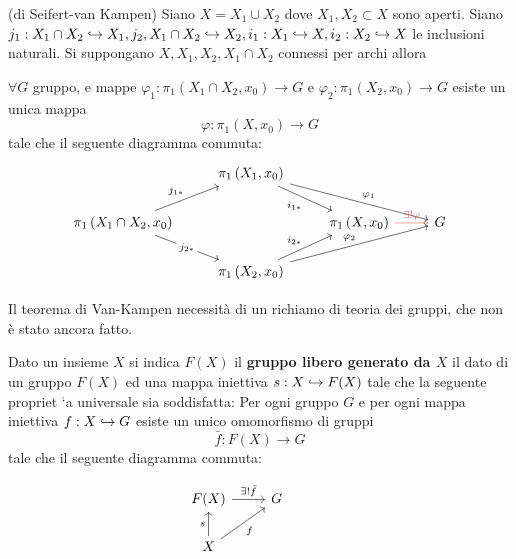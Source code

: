 \documentclass[]{article}
\begin{document}
\begin{theorem} (di Seifert-van Kampen) \nl
    Siano $X = X_1 \cup X_2$ dove $X_1, X_2 \subset X$ sono aperti. \nl
    Siano $j_1: X_1 \cap X_2 \hookrightarrow X_1, j_2, X_1 \cap X_2 \hookrightarrow X_2, i_1: X_1 \hookrightarrow X, i_2: X_2 \hookrightarrow X$ le inclusioni naturali. \nl
    Si suppongano $X, X_1, X_2, X_1 \cap X_2$ connessi per archi allora

    $\forall G$ gruppo, e mappe $\varphi_1: \pi_1(X_1 \cap X_2, x_0) \to G$ e $\varphi_2: \pi_1(X_2, x_0) \to G$ esiste un unica mappa
    \[
        \varphi: \pi_1(X, x_0) \to G
    \]
    tale che il seguente diagramma commuta:
    \[\begin{tikzcd}
	& {\pi_1\left(X_1, x_0\right)} \\
	{\pi_1\left(X_1 \cap X_2, x_0\right)} && {\pi_1\left(X, x_0\right)} & G \\
	& {\pi_1\left(X_2, x_0\right)}
	\arrow["{i_{1*}}"', from=1-2, to=2-3]
	\arrow["{\varphi_1}", from=1-2, to=2-4]
	\arrow["{j_{1*}}", from=2-1, to=1-2]
	\arrow["{j_{2*}}"{description}, from=2-1, to=3-2]
	\arrow["{\exists!\varphi}", color={rgb,255:red,214;green,92;blue,92}, from=2-3, to=2-4]
	\arrow["{i_{2*}}", from=3-2, to=2-3]
	\arrow["{\varphi_2}", from=3-2, to=2-4]
    \end{tikzcd}\]
\end{theorem}

Il teorema di Van-Kampen necessit\`a di un richiamo di teoria dei gruppi, che non \`e stato ancora fatto. \nl

\begin{definition}  \nl
    Dato un insieme $X$ si indica $F(X)$ il \textbf{gruppo libero generato da $X$} il dato di
    un gruppo $F(X)$ ed una mappa iniettiva $s: X \hookrightarrow F(X)$ tale che la seguente propriet
    `a universale sia soddisfatta: \nl 
    Per ogni gruppo $G$ e per ogni mappa iniettiva $f: X \hookrightarrow G$ esiste un unico omomorfismo di gruppi
    \[
        \bar{f}: F(X) \to G
    \]
    tale che il seguente diagramma commuta:

    \[\begin{tikzcd}
	{F(X)} & G & {} \\
	X
	\arrow["{\exists!\bar{f}}", from=1-1, to=1-2]
	\arrow["s", from=2-1, to=1-1]
	\arrow["f"', from=2-1, to=1-2]
    \end{tikzcd}\]

\end{definition}
\end{document}
